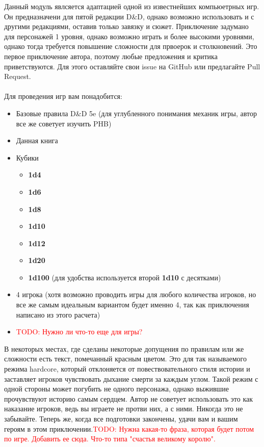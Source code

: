 \documentclass[10pt,a4paper]{book}
\newcommand{\TODO}[1]{\textcolor{red}{TODO: #1}}
\renewcommand{\d}[2][1]{\textbf {#1d{#2}}}
\begin{document}
			Данный модуль явлсяется адаптацией одной из известнейших компьюетрных игр. Он предназначени для пятой редакции D\&D, однако возможно использовать и с другими редакциями, оставив только завязку и сюжет. Приключение задумано для персонажей 1 уровня, однако возможно играть и более высокими уровнями, однако тогда требуется повышение сложности для првоерок и столкновений. Это первое приключение автора, поэтому любые предложения и критика приветствуются. Для этого оставляйте свои issue на GitHub или предлагайте Pull Request.
			\\\\
			Для проведения игр вам понадобится:
			\begin{itemize}
				\item Базовые правила D\&D 5e (для углубленного понимания механик игры, автор все же советует изучить PHB)
				\item Данная книга
				\item Кубики
					\begin{itemize}
						\item \d{4}
						\item \d{6}
						\item \d{8}
						\item \d{10}
						\item \d{12}
						\item \d{20}
						\item \d{100} (для удобства используется второй \d{10} с десятками)
					\end{itemize}
				\item 4 игрока (хотя возможно проводить игры для любого количества игроков, но все же самым идеальным вариантом будет именно 4, так как приключения написано из этого расчета)
				\item \TODO{Нужно ли что-то еще для игры?}
			\end{itemize}
			В некоторых местах, где сделаны некоторые допущения по правилам или же сложности есть текст, помечанный красным цветом. Это для так называемого режима hardcore, который отклоняется от повествовательного стиля истории и заставляет игроков чувствовать дыхание смерти за каждым углом. Такой режим с одной стороны может погубить не одного персонажа, однако выжившие прочувствуют историю самым сердцем. Автор не советует использовать это как наказание игроков, ведь вы играете не протви них, а с ними. Никогда это не забывайте.
			Теперь же, когда все подготовки закончены, удачи вам и вашим героям в этом приключении.\TODO{Нужна какая-то фраза, которая будет потом по игре. Добавить ее сюда. Что-то типа "счастья великому королю".}	
		
\end{document}
